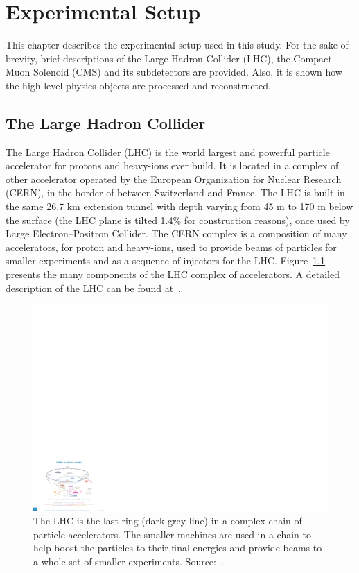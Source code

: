 
\chapter{Experimental Setup}

This chapter describes the experimental setup used in this study.  For the sake of brevity, brief descriptions of the Large Hadron Collider (LHC), the Compact Muon Solenoid (CMS) and its  subdetectors are provided. Also, it is shown how  the high-level physics objects are processed and reconstructed.

\section{The Large Hadron Collider}

The Large Hadron Collider (LHC) is the world largest and powerful particle accelerator for protons and heavy-ions ever build. It is located in a complex of other accelerator operated by the European Organization for Nuclear Research (CERN), in the border of between Switzerland and France. The LHC is built in the same 26.7 km extension tunnel with depth varying from 45 m to 170 m below the surface (the LHC plane is tilted 1.4\% for construction reasons), once used by Large Electron–Positron Collider. The CERN complex is a composition of many accelerators, for proton and heavy-ions, used to provide beams of particles for smaller experiments and as a sequence of injectors for the LHC. Figure~\ref{lhc_complex} presents the many components of the LHC complex of accelerators. A detailed description of the LHC can be found at~\cite{Evans:2008zzb, Bruning:782076, Bruning:815187, Benedikt:823808}.

\begin{figure}[htbp]
    \centering
    \includegraphics[width=\textwidth]{figures_and_tables/experimental_setup/lhc_complex.pdf}
    \caption{The LHC is the last ring (dark grey line) in a complex chain of particle accelerators. The smaller machines are used in a chain to help boost the particles to their final energies and provide beams to a whole set of smaller experiments. Source:~\cite{lhc_complex}.}
    \label{lhc_complex}
\end{figure}


